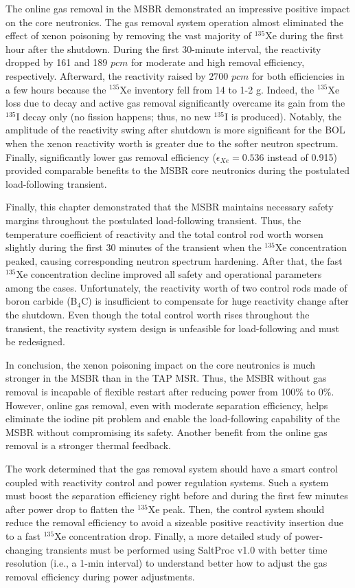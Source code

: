 The online gas removal in the \gls{MSBR} demonstrated an impressive positive 
impact on the core neutronics. The gas removal system operation almost 
eliminated the effect of xenon poisoning by removing the vast majority of 
$^{135}$Xe during the first hour after the shutdown. During the first 
30-minute interval, 
the reactivity dropped by 161 and 189 $pcm$ for moderate and high removal 
efficiency, respectively. Afterward, the reactivity raised by 
$2700$ $pcm$ for both efficiencies in a few hours because the $^{135}$Xe 
inventory fell from 14 to 1-2 g. Indeed, the $^{135}$Xe loss due to decay 
and active gas removal significantly  overcame its gain from the $^{135}$I 
decay only (no fission happens; thus, no new $^{135}$I is produced). Notably, 
the amplitude of the reactivity swing after shutdown is more significant for 
the \gls{BOL} when the xenon reactivity worth is greater due to the softer 
neutron spectrum. Finally, significantly lower gas removal efficiency 
($\epsilon_{Xe}=0.536$ instead of 0.915) provided comparable benefits to the 
\gls{MSBR} core neutronics during the postulated load-following transient.

Finally, this chapter demonstrated that the \gls{MSBR} maintains necessary 
safety margins throughout the postulated load-following transient. Thus, the 
temperature coefficient of reactivity and the total control rod worth worsen 
slightly during the first 30 minutes of the transient when the $^{135}$Xe 
concentration peaked, causing corresponding neutron spectrum hardening. After 
that, the fast $^{135}$Xe concentration decline improved all safety and 
operational parameters among the cases. Unfortunately, the reactivity worth of 
two control rods made of boron carbide (B$_4$C) is insufficient to compensate 
for huge reactivity change after the shutdown. Even though the total control 
worth rises throughout the transient, the reactivity system design is 
unfeasible for load-following and must be redesigned. 

In conclusion, the xenon poisoning impact on the core neutronics is much 
stronger in the \gls{MSBR} than in the \gls{TAP} \gls{MSR}. Thus, the 
\gls{MSBR} without gas removal is incapable of flexible restart after
reducing power from 100\% to 0\%. However, online gas removal, even with 
moderate separation efficiency, helps eliminate the iodine pit problem and 
enable the load-following capability of the \gls{MSBR} without compromising 
its safety. Another benefit from the online gas removal is a stronger thermal 
feedback.

The work determined that the gas removal system should have a smart control 
coupled with reactivity control and power regulation systems.
Such a system must boost the separation efficiency right before and during the 
first few minutes after power drop to flatten the $^{135}$Xe peak. 
Then, the control system should reduce the removal efficiency to avoid a
sizeable positive reactivity insertion due to a fast $^{135}$Xe concentration 
drop. Finally, a more detailed study of power-changing transients must be 
performed using SaltProc v1.0 with better time resolution (i.e., a 1-min 
interval) to understand better how to adjust the gas removal efficiency during 
power adjustments.
